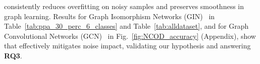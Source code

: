 \method consistently reduces overfitting on noisy samples and preserves smoothness in graph learning. Results for Graph Isomorphism Networks (GIN)~\cite{WL1} in Table~\ref{tab:ppa_30_perc_6_classes} and Table~\ref{tab:alldataset}, and for Graph Convolutional Networks (GCN)~\cite{gcn} in Fig.~\ref{fig:NCOD_accuracy} (Appendix), show that \method effectively mitigates noise impact, validating our hypothesis and answering \textbf{RQ3}.





\begin{table}[htbp]
  \centering

 
    \centering
    \caption{Performance on the PPA dataset using 30\% of the data restricted to 6 selected classes. The best test accuracy is highlighted in bold red, the second best in blue. Reported values denote mean ± standard deviation across 4 independent runs}
    \label{tab:ppa_30_perc_6_classes}

    \renewcommand{\arraystretch}{1.2}
\end{table}
